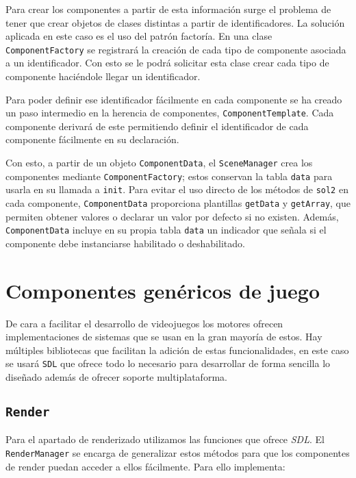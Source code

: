 \medskip

Para crear los componentes a partir de esta información surge el problema de tener que crear objetos de clases distintas a partir de identificadores. La solución aplicada en este caso es el uso del patrón factoría. En una clase \texttt{ComponentFactory} se registrará la creación de cada tipo de componente asociada a un identificador. Con esto se le podrá solicitar esta clase crear cada tipo de componente haciéndole llegar un identificador. 

\smallskip

Para poder definir ese identificador fácilmente en cada componente se ha creado un paso intermedio en la herencia de componentes, \texttt{ComponentTemplate}. Cada componente derivará de este permitiendo definir el identificador de cada componente fácilmente en su declaración. 

\smallskip

Con esto, a partir de un objeto \texttt{ComponentData}, el \texttt{SceneManager} crea los componentes mediante \texttt{ComponentFactory}; estos conservan la tabla \texttt{data} para usarla en su llamada a \texttt{init}. Para evitar el uso directo de los métodos de \texttt{sol2} en cada componente, \texttt{ComponentData} proporciona plantillas \texttt{getData} y \texttt{getArray}, que permiten obtener valores o declarar un valor por defecto si no existen. Además, \texttt{ComponentData} incluye en su propia tabla \texttt{data} un indicador que señala si el componente debe instanciarse habilitado o deshabilitado. 

\section{Componentes genéricos de juego}
De cara a facilitar el desarrollo de videojuegos los motores ofrecen implementaciones de sistemas que se usan en la gran mayoría de estos. Hay múltiples bibliotecas que facilitan la adición de estas funcionalidades, en este caso se usará \texttt{SDL} que ofrece todo lo necesario para desarrollar de forma sencilla lo diseñado además de ofrecer soporte multiplataforma. 

\subsection{\texttt{Render}}
Para el apartado de renderizado utilizamos las funciones que ofrece \textit{SDL}. El \texttt{RenderManager} se encarga de generalizar estos métodos para que los componentes de render puedan acceder a ellos fácilmente. Para ello implementa: 

